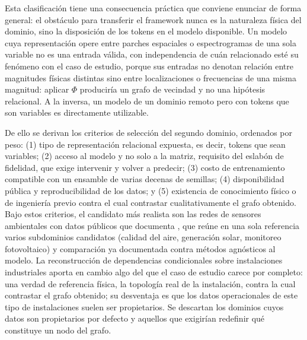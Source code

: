Esta clasificación tiene una consecuencia práctica que conviene enunciar de forma general: el obstáculo para transferir el framework nunca es la naturaleza física del dominio, sino la disposición de los tokens en el modelo disponible. Un modelo cuya representación opere entre parches espaciales o espectrogramas de una sola variable no es una entrada válida, con independencia de cuán relacionado esté su fenómeno con el caso de estudio, porque sus entradas no denotan relación entre magnitudes físicas distintas sino entre localizaciones o frecuencias de una misma magnitud: aplicar $\Phi$ produciría un grafo de vecindad y no una hipótesis relacional. A la inversa, un modelo de un dominio remoto pero con tokens que son variables es directamente utilizable.

De ello se derivan los criterios de selección del segundo dominio, ordenados por peso: (1) tipo de representación relacional expuesta, es decir, tokens que sean variables; (2) acceso al modelo y no solo a la matriz, requisito del eslabón de fidelidad, que exige intervenir y volver a predecir; (3) costo de entrenamiento compatible con un ensamble de varias decenas de semillas; (4) disponibilidad pública y reproducibilidad de los datos; y (5) existencia de conocimiento físico o de ingeniería previo contra el cual contrastar cualitativamente el grafo obtenido. Bajo estos criterios, el candidato más realista son las redes de sensores ambientales con datos públicos que documenta \cite{spatiotemporal2024e2e}, que reúne en una sola referencia varios subdominios candidatos (calidad del aire, generación solar, monitoreo fotovoltaico) y comparación ya documentada contra métodos agnósticos al modelo. La reconstrucción de dependencias condicionales sobre instalaciones industriales \cite{pipeline2026causalgraph} aporta en cambio algo del que el caso de estudio carece por completo: una verdad de referencia física, la topología real de la instalación, contra la cual contrastar el grafo obtenido; su desventaja es que los datos operacionales de este tipo de instalaciones suelen ser propietarios. Se descartan los dominios cuyos datos son propietarios por defecto y aquellos que exigirían redefinir qué constituye un nodo del grafo.

